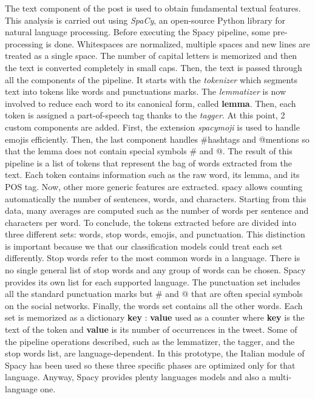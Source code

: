 The text component of the post is used to obtain fundamental textual features. This analysis is carried out using \textit{SpaCy}, an open-source Python library for natural language processing.
Before executing the Spacy pipeline, some pre-processing is done. Whitespaces are normalized, multiple spaces and new lines are treated as a single space. The number of capital letters is memorized and then the text is converted completely in small caps.
Then, the text is passed through all the components of the pipeline. It starts with the \textit{tokenizer} which segments text into tokens like words and punctuations marks. The \textit{lemmatizer} is now involved to reduce each word to its canonical form, called \textbf{lemma}. Then, each token is assigned a part-of-speech tag thanks to the \textit{tagger}.
At this point, 2 custom components are added. First, the extension \textit{spacymoji} is used to handle emojis efficiently. Then, the last component handles \#hashtags and @mentions so that the lemma does not contain special symbols \# and @.
The result of this pipeline is a list of tokens that represent the bag of words extracted from the text. Each token contains information such as the raw word, its lemma, and its POS tag.
Now, other more generic features are extracted. spacy allows counting automatically the number of sentences, words, and characters. Starting from this data, many averages are computed such as the number of words per sentence and characters per word.
To conclude, the tokens extracted before are divided into three different sets: words, stop words, emojis, and punctuation.
This distinction is important because we that our classification models could treat each set differently.
Stop words refer to the most common words in a language. There is no single general list of stop words and any group of words can be chosen. Spacy provides its own list for each supported language.
The punctuation set includes all the standard punctuation marks but \# and @ that are often special symbols on the social networks.
Finally, the words set contains all the other words.
Each set is memorized as a dictionary {\textbf{key} : \textbf{value}} used as a counter where \textbf{key} is the text of the token and \textbf{value} is its number of occurrences in the tweet.  
Some of the pipeline operations described, such as the lemmatizer, the tagger, and the stop words list, are language-dependent. In this prototype, the Italian module of Spacy has been used so these three specific phases are optimized only for that language. Anyway, Spacy provides plenty languages models and also a multi-language one.

